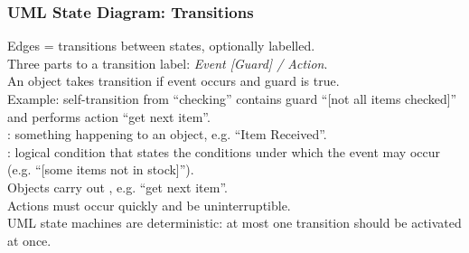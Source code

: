 \begin{frame}
\frametitle{UML State Diagram: Transitions}

\begin{changemargin}{1cm}
Edges = transitions between states,
optionally labelled.\\

Three parts
to a transition label: \emph{Event [Guard] / Action}.\\[1em]
\alert{An object takes transition if event occurs and guard is true.}\\

Example: self-transition from  ``checking''
contains  guard ``[not all items checked]'' and performs
 action ``get next item''. \\[1em]

: something happening to an object, e.g. ``Item
Received''.  \\

: logical condition that states the conditions
under which the event may occur (e.g. ``[some items not in stock]'').\\[1em]

Objects carry out , e.g. ``get next
item''.\\
Actions must occur quickly and be uninterruptible.\\[1em]



UML state machines are deterministic: at most one
transition should be activated at once.

\end{changemargin}
\end{frame}

